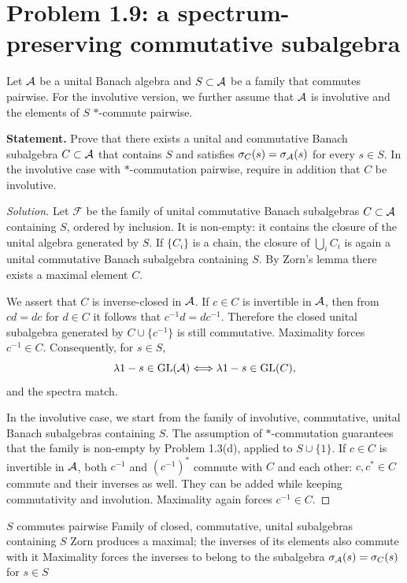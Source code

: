 \section{Problem 1.9: a spectrum-preserving commutative subalgebra}

Let $\mathcal A$ be a unital Banach algebra and $S\subset\mathcal A$ be a family that commutes pairwise. For the
involutive version, we further assume that $\mathcal A$ is involutive and the elements of $S$
$*$-commute pairwise.

\noindent\textbf{Statement.} Prove that there exists a unital and commutative Banach subalgebra $C\subset\mathcal A$ that contains $S$ and satisfies $\sigma_C(s)=\sigma_\mathcal A(s)$ for every $s\in S$. In the involutive case with $*$-commutation pairwise, require in addition that $C$ be involutive.

\begin{proof}[Solution]
Let $\mathscr F$ be the family of unital commutative Banach subalgebras $C\subset\mathcal A$ containing $S$, ordered by inclusion. It is non-empty: it contains the closure of the unital algebra generated by
$S$. If $\{C_i\}$ is a chain, the closure of $\bigcup_i C_i$ is again a unital commutative Banach subalgebra containing $S$. By Zorn's lemma there exists a maximal element $C$.

We assert that $C$ is inverse-closed in $\mathcal A$. If $c\in C$ is invertible in $\mathcal A$, then
from $cd=dc$ for $d\in C$ it follows that $c^{-1}d=dc^{-1}$. Therefore the closed unital subalgebra
generated by $C\cup\{c^{-1}\}$ is still commutative. Maximality forces
$c^{-1}\in C$. Consequently, for $s\in S$,
\[
\lambda1-s\in\operatorname{GL}(\mathcal A)\Longleftrightarrow\lambda1-s\in\operatorname{GL}(C),
\]
and the spectra match.

In the involutive case, we start from the family of involutive, commutative, unital Banach subalgebras containing $S$. The assumption of $*$-commutation guarantees that the family is non-empty by
Problem 1.3(d), applied to $S\cup\{1\}$. If $c\in C$ is invertible in $\mathcal A$, both $c^{-1}$ and $(c^{-1})^*$ commute with
$C$ and each other: $c,c^*\in C$ commute and their inverses as well. They can be added while keeping
commutativity and involution. Maximality again forces $c^{-1}\in C$.
\end{proof}

\proofdiagrambranch
{$S$ commutes pairwise}
{Family of closed, commutative, unital subalgebras containing $S$}
{Zorn produces a maximal; the inverses of its elements also commute with it}
{Maximality forces the inverses to belong to the subalgebra}
{$\sigma_\mathcal A(s)=\sigma_C(s)$ for $s\in S$}

